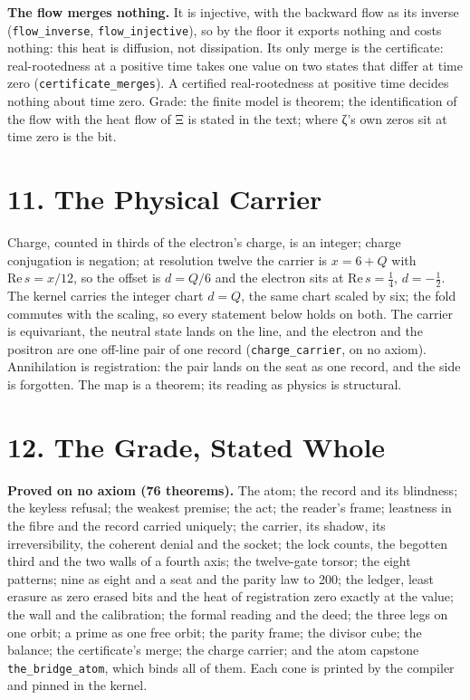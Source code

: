 \documentclass[10pt,twocolumn]{article}
\begin{document}
\textbf{The flow merges nothing.} It is injective, with the backward
flow as its inverse (\texttt{flow\_\allowbreak{}inverse}, \texttt{flow\_\allowbreak{}injective}),
so by the floor it exports nothing and costs nothing: this heat is
diffusion, not dissipation. Its only merge is the certificate:
real-rootedness at a positive time takes one value on two states that
differ at time zero (\texttt{certificate\_\allowbreak{}merges}). A certified
real-rootedness at positive time decides nothing about time zero. Grade:
the finite model is theorem; the identification of the flow with the
heat flow of Ξ is stated in the text; where ζ's own zeros sit at time
zero is the bit.

\hypertarget{the-physical-carrier}{%
\section{11. The Physical Carrier}\label{the-physical-carrier}}

Charge, counted in thirds of the electron's charge, is an integer;
charge conjugation is negation; at resolution twelve the carrier is
\(x=6+Q\) with \(\mathrm{Re}\,s=x/12\), so the offset is \(d=Q/6\) and
the electron sits at \(\mathrm{Re}\,s=\tfrac14\), \(d=-\tfrac12\). The
kernel carries the integer chart \(d=Q\), the same chart scaled by six;
the fold commutes with the scaling, so every statement below holds on
both. The carrier is equivariant, the neutral state lands on the line,
and the electron and the positron are one off-line pair of one record
(\texttt{charge\_\allowbreak{}carrier}, on no axiom). Annihilation is registration:
the pair lands on the seat as one record, and the side is forgotten. The
map is a theorem; its reading as physics is structural.

\hypertarget{the-grade-stated-whole}{%
\section{12. The Grade, Stated Whole}\label{the-grade-stated-whole}}

\textbf{Proved on no axiom (76 theorems).} The atom; the record and its
blindness; the keyless refusal; the weakest premise; the act; the
reader's frame; leastness in the fibre and the record carried uniquely;
the carrier, its shadow, its irreversibility, the coherent denial and
the socket; the lock counts, the begotten third and the two walls of a
fourth axis; the twelve-gate torsor; the eight patterns; nine as eight
and a seat and the parity law to 200; the ledger, least erasure as zero
erased bits and the heat of registration zero exactly at the value; the
wall and the calibration; the formal reading and the deed; the three
legs on one orbit; a prime as one free orbit; the parity frame; the
divisor cube; the balance; the certificate's merge; the charge carrier;
and the atom capstone \texttt{the\_\allowbreak{}bridge\_\allowbreak{}atom}, which binds all of
them. Each cone is printed by the compiler and pinned in the kernel.
\end{document}

